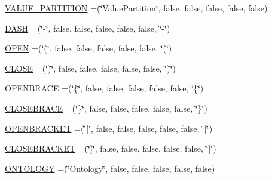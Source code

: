 \begin{DoxyCompactItemize}
\item 
\hyperlink{enumorg_1_1coode_1_1owlapi_1_1manchesterowlsyntax_1_1_manchester_o_w_l_syntax_a524fe1f5766519b172cdbf446b6dbaf2}{V\-A\-L\-U\-E\-\_\-\-P\-A\-R\-T\-I\-T\-I\-O\-N} =(\char`\"{}Value\-Partition\char`\"{}, false, false, false, false, false)
\item 
\hyperlink{enumorg_1_1coode_1_1owlapi_1_1manchesterowlsyntax_1_1_manchester_o_w_l_syntax_af260fd2df063964870d24d71b70761e2}{D\-A\-S\-H} =(\char`\"{}-\/\char`\"{}, false, false, false, false, false, \char`\"{}-\/\char`\"{})
\item 
\hyperlink{enumorg_1_1coode_1_1owlapi_1_1manchesterowlsyntax_1_1_manchester_o_w_l_syntax_a5b8a4e74617766d553586bad2139eae8}{O\-P\-E\-N} =(\char`\"{}(\char`\"{}, false, false, false, false, false, \char`\"{}(\char`\"{})
\item 
\hyperlink{enumorg_1_1coode_1_1owlapi_1_1manchesterowlsyntax_1_1_manchester_o_w_l_syntax_a3d60865fffac030f874f500a4b04dbba}{C\-L\-O\-S\-E} =(\char`\"{})\char`\"{}, false, false, false, false, false, \char`\"{})\char`\"{})
\item 
\hyperlink{enumorg_1_1coode_1_1owlapi_1_1manchesterowlsyntax_1_1_manchester_o_w_l_syntax_a304bde8275e59bbbf2c3e1c75f7b29aa}{O\-P\-E\-N\-B\-R\-A\-C\-E} =(\char`\"{}\{\char`\"{}, false, false, false, false, false, \char`\"{}\{\char`\"{})
\item 
\hyperlink{enumorg_1_1coode_1_1owlapi_1_1manchesterowlsyntax_1_1_manchester_o_w_l_syntax_a25d9206753a41c29193c640e8c7111b5}{C\-L\-O\-S\-E\-B\-R\-A\-C\-E} =(\char`\"{}\}\char`\"{}, false, false, false, false, false, \char`\"{}\}\char`\"{})
\item 
\hyperlink{enumorg_1_1coode_1_1owlapi_1_1manchesterowlsyntax_1_1_manchester_o_w_l_syntax_a27067a01ed4dd9f20d07d431aace7e2f}{O\-P\-E\-N\-B\-R\-A\-C\-K\-E\-T} =(\char`\"{}\mbox{[}\char`\"{}, false, false, false, false, false, \char`\"{}\mbox{[}\char`\"{})
\item 
\hyperlink{enumorg_1_1coode_1_1owlapi_1_1manchesterowlsyntax_1_1_manchester_o_w_l_syntax_a765f21c6ed96bae5ab2ac0c58ae771fe}{C\-L\-O\-S\-E\-B\-R\-A\-C\-K\-E\-T} =(\char`\"{}\mbox{]}\char`\"{}, false, false, false, false, false, \char`\"{}\mbox{]}\char`\"{})
\item 
\hyperlink{enumorg_1_1coode_1_1owlapi_1_1manchesterowlsyntax_1_1_manchester_o_w_l_syntax_a15c6a9eba2a40cbaaef2c83bbc21ab76}{O\-N\-T\-O\-L\-O\-G\-Y} =(\char`\"{}Ontology\char`\"{}, false, false, false, false, false)

\end{DoxyCompactItemize}
